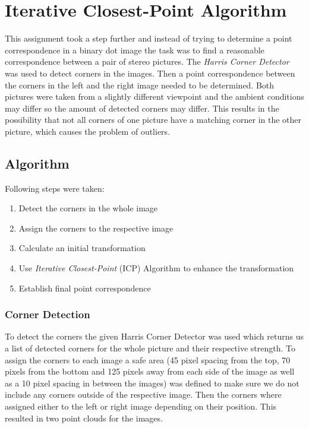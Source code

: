\chapter{Iterative Closest-Point Algorithm}
\label{chapter:icp}

This assignment took a step further and instead of trying to determine a point correspondence in a binary dot image the task was to find a reasonable correspondence between a pair of stereo pictures.
The \textit{Harris Corner Detector}\cite{Harris2020} was used to detect corners in the images. Then a point correspondence between the corners in the left and the right image needed to be determined. Both pictures were taken from a slightly different viewpoint and the ambient conditions may differ so the amount of detected corners may differ. This results in the possibility that not all corners of one picture have a matching corner in the other picture, which causes the problem of outliers. 


\section{Algorithm}

Following steps were taken:

\begin{enumerate}
	\item Detect the corners in the whole image
	\item Assign the corners to the respective image
	\item Calculate an initial transformation
	\item Use \textit{Iterative Closest-Point} (ICP) Algorithm to enhance the transformation
	\item Establish final point correspondence
\end{enumerate}

\subsection{Corner Detection}
To detect the corners the given Harris Corner Detector was used which returns us a list of detected corners for the whole picture and their respective strength. To assign the corners to each image a safe area (45 pixel spacing from the top, 70 pixels from the bottom and 125 pixels away from each side of the image as well as a 10 pixel spacing in between the images) was defined to make sure we do not include any corners outside of the respective image. Then the corners where assigned either to the left or right image depending on their position. This resulted in two point clouds for the images.

